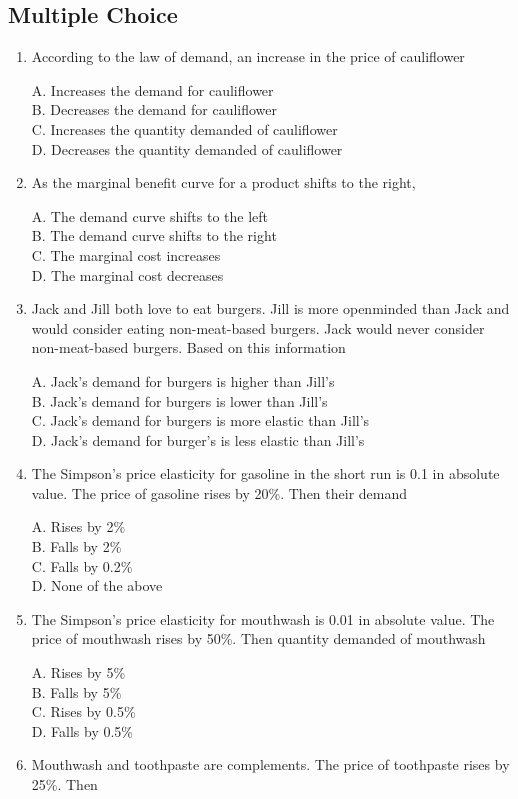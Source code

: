 \documentclass[
]{book}
\begin{document}
\hypertarget{multiple-choice-3}{%
\subsection{Multiple Choice}\label{multiple-choice-3}}

\begin{enumerate}
\def\labelenumi{\arabic{enumi}.}
\item
  According to the law of demand, an increase in the price of cauliflower

  A. Increases the demand for cauliflower\\
  B. Decreases the demand for cauliflower\\
  C. Increases the quantity demanded of cauliflower\\
  D. Decreases the quantity demanded of cauliflower
\item
  As the marginal benefit curve for a product shifts to the right,

  A. The demand curve shifts to the left\\
  B. The demand curve shifts to the right\\
  C. The marginal cost increases\\
  D. The marginal cost decreases
\item
  Jack and Jill both love to eat burgers. Jill is more openminded than Jack and would consider eating non-meat-based burgers. Jack would never consider non-meat-based burgers. Based on this information

  A. Jack's demand for burgers is higher than Jill's\\
  B. Jack's demand for burgers is lower than Jill's\\
  C. Jack's demand for burgers is more elastic than Jill's\\
  D. Jack's demand for burger's is less elastic than Jill's
\item
  The Simpson's price elasticity for gasoline in the short run is 0.1 in absolute value. The price of gasoline rises by 20\%. Then their demand

  A. Rises by 2\%\\
  B. Falls by 2\%\\
  C. Falls by 0.2\%\\
  D. None of the above
\item
  The Simpson's price elasticity for mouthwash is 0.01 in absolute value. The price of mouthwash rises by 50\%. Then quantity demanded of mouthwash

  A. Rises by 5\%\\
  B. Falls by 5\%\\
  C. Rises by 0.5\%\\
  D. Falls by 0.5\%
\item
  Mouthwash and toothpaste are complements. The price of toothpaste rises by 25\%. Then


\end{enumerate}
\end{document}
